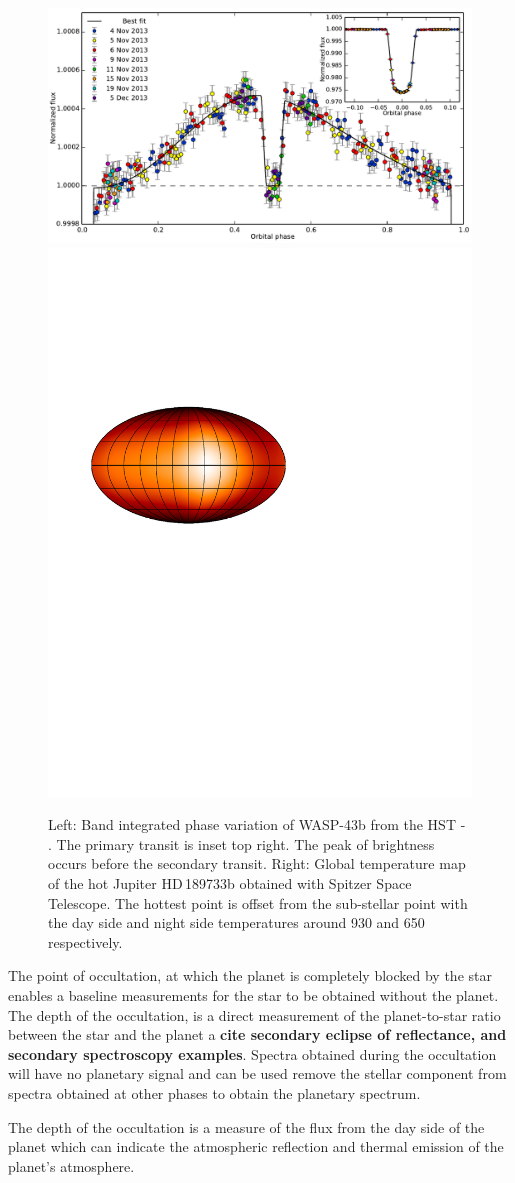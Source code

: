 \begin{figure}
    \centering
    \includegraphics[width=0.5\linewidth]{figures/introduction/stevenson_phasecurve2014.pdf}
     \includegraphics[width=0.4\linewidth]{figures/introduction/knutson_2007_temperature_map_HD_189733b.pdf}
    \caption{Left: Band integrated phase variation of {WASP-43b} from the HST - \cite{stevenson_thermal_2014}. The primary transit is inset top right.
    The peak of brightness occurs before the secondary transit.
    Right: Global temperature map of the hot Jupiter HD\,189733b obtained with {Spitzer Space Telescope}\citep{knutson_map_2007}. The hottest point is offset from the sub-stellar point with the day side and night side temperatures around 930\K{} and 650\K{} respectively.}
    \label{fig:stevensonphasecurve2014}
\end{figure}

The point of occultation, at which the planet is completely blocked by the star enables a baseline measurements for the star to be obtained without the planet. The depth of the occultation, is a direct measurement of the planet-to-star ratio between the star and the planet a \textbf{{cite secondary eclipse of reflectance, and secondary spectroscopy examples}}. Spectra obtained during the occultation will have no planetary signal and can be used remove the stellar component from spectra obtained at other phases to obtain the planetary spectrum.


The depth of the occultation is a measure of the flux from the day side of the planet which can indicate the atmospheric reflection and thermal emission of the planet's atmosphere.


